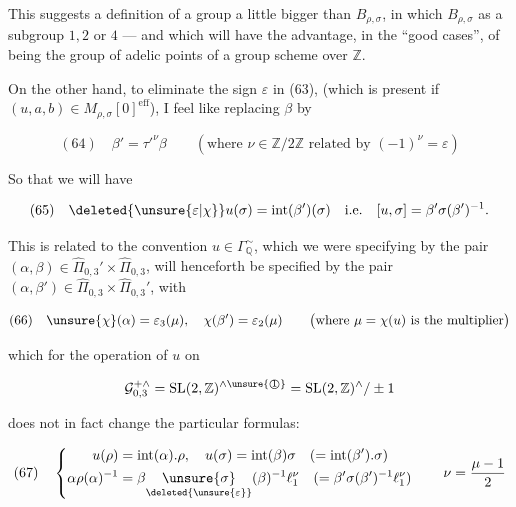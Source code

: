 This suggests a definition of a group a little bigger than $B_{\rho,\sigma}$,
in which $B_{\rho,\sigma}$  
as a  subgroup 
$1,2$ or $4$ --- and which will have the advantage, in the ``good cases'', of being the group
of adelic points of a  group scheme over $\mathbb Z$.

On the other hand, to  eliminate the sign
$\varepsilon$ in (63), (which is present  if
$(u,a,b)\in M_{\rho,\sigma}[0]^{\mathrm{eff}}$), I feel like replacing $\beta$ by


\[
(64)\quad \beta'=\tau'^{\nu}\beta
\qquad\left(\text{where }\nu\in\mathbb Z/2\mathbb Z\text{ related by }
(-1)^\nu=\varepsilon\right)
\]

So that we will have

\[
(65)\quad \deleted{\unsure{\varepsilon|\chi}}u(\sigma)=\operatorname{int}(\beta')(\sigma)
\quad\text{i.e.}\quad [u,\sigma]=\beta'\sigma(\beta')^{-1}.
\]

This is related to the convention 
$u\in\Gamma_{\mathbb Q}^{\sim}$, which we were specifying by the pair
$(\alpha,\beta)\in\widehat{\Pi}_{0,3}'\times\widehat{\Pi}_{0,3}$,
will henceforth be specified by the pair
$(\alpha,\beta')\in\widehat{\Pi}_{0,3}\times\widehat{\Pi}_{0,3}'$, with

\[
(66)\quad\unsure{\chi}(\alpha)=\varepsilon_3(\mu),
\quad\chi(\beta')=\varepsilon_2(\mu)
\qquad\bigl(\text{where }\mu=\chi(u)\text{ is the multiplier}\bigr)
\]

which  for the operation of $u$ on

\[
\mathcal G_{0,3}^{+\wedge}
=\mathrm{SL}(2,\mathbb Z)^{\wedge\unsure{\text{\textcircled{1}}}}
=\mathrm{SL}(2,\mathbb Z)^{\wedge}/\pm1
\]

does not in fact change the particular formulas:

\[
(67)\quad\left\{\begin{aligned}
u(\rho)&=\operatorname{int}(\alpha).\rho,\quad
u(\sigma)=\operatorname{int}(\beta)\sigma
\quad(=\operatorname{int}(\beta').\sigma)\\
\alpha\rho(\alpha)^{-1}
&=\beta\underset{\deleted{\unsure{\varepsilon}}}{\unsure{\sigma}}(\beta)^{-1}\ell_1^\nu
\quad(=\beta'\sigma(\beta')^{-1}\ell_1^\nu)
\end{aligned}\right.
\qquad\nu=\frac{\mu-1}{2}
\]

